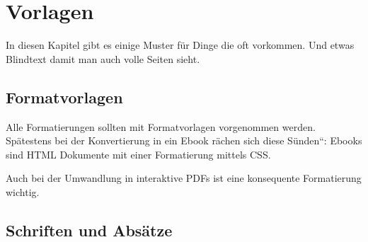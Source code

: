 
\section{Vorlagen}

In diesen Kapitel gibt es einige Muster für Dinge die oft vorkommen.
Und etwas Blindtext damit man auch volle Seiten sieht.


\subsection{Formatvorlagen}

Alle Formatierungen sollten mit Formatvorlagen vorgenommen werden.
Spätestens bei der Konvertierung in ein Ebook rächen sich diese \quotedblbase Sünden``:
Ebooks sind HTML Dokumente mit einer Formatierung mittels CSS.

Auch bei der Umwandlung in interaktive PDFs ist eine konsequente Formatierung
wichtig.


\subsection{Schriften und Absätze}

